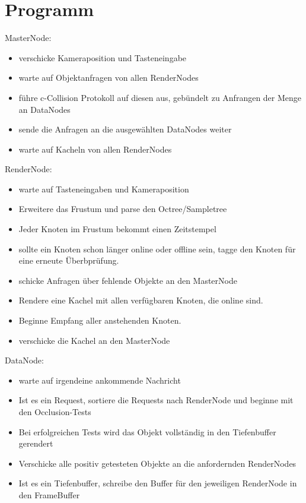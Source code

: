 \section{Programm}
\label{sec:impl:program}
\label{masternode}
MasterNode:
\begin{itemize}
 \item verschicke Kameraposition und Tasteneingabe
 \item warte auf Objektanfragen von allen RenderNodes
 \item führe c-Collision Protokoll auf diesen aus, gebündelt zu Anfrangen der Menge an DataNodes
 \item sende die Anfragen an die ausgewählten DataNodes weiter
 \item warte auf Kacheln von allen RenderNodes
\end{itemize}

\label{rendernode}
RenderNode:
\begin{itemize}
 \item warte auf Tasteneingaben und Kameraposition
 \item Erweitere das Frustum und parse den Octree/Sampletree
 \item Jeder Knoten im Frustum bekommt einen Zeitstempel
 \item sollte ein Knoten schon länger online oder offline sein, tagge den Knoten für eine erneute Überbprüfung.
 \item schicke Anfragen über fehlende Objekte an den MasterNode
 \item Rendere eine Kachel mit allen verfügbaren Knoten, die online sind.
 \item Beginne Empfang aller anstehenden Knoten.
 \item verschicke die Kachel an den MasterNode
\end{itemize}

\label{datanode}
DataNode:
\begin{itemize}
 \item warte auf irgendeine ankommende Nachricht
 \item Ist es ein Request, sortiere die Requests nach RenderNode und beginne mit den Occlusion-Tests
 \item Bei erfolgreichen Tests wird das Objekt vollständig in den Tiefenbuffer gerendert
 \item Verschicke alle positiv getesteten Objekte an die anfordernden RenderNodes
 \item Ist es ein Tiefenbuffer, schreibe den Buffer für den jeweiligen RenderNode in den FrameBuffer
\end{itemize}


